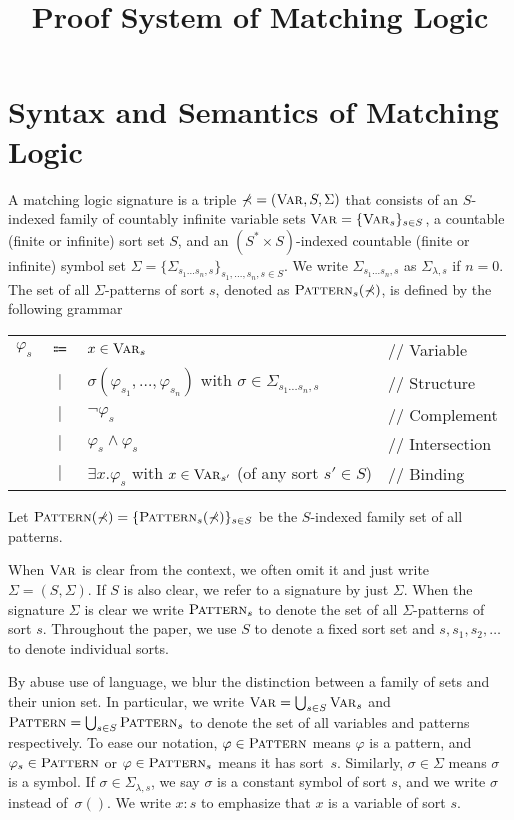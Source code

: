 \documentclass[acmsmall]{acmart}
\title{Proof System of Matching Logic}
\theoremstyle{acmdefinition}
\newcommand{\Var}{\textnormal{\textsc{Var}}}
\newcommand{\sig}{\mathbb{\Sigma}}
\newcommand{\Pattern}{\textnormal{\textsc{Pattern}}}
\newcommand{\ddd}{,\dots,}
\newcommand{\cln}{{:}}
\newcommand{\doubleslash}{//\xspace}
\newcommand{\SigmaSub}[1]{\Sigma_{#1}}
\begin{document}
\maketitle

\section{Syntax and Semantics of Matching Logic}

\begin{definition}
\label{def_syntax}
A matching logic signature is a triple
$\sig = (\Var, S, \Sigma)$
that consists of
an $S$-indexed family of countably infinite variable sets
$\Var = \{ \Var_s \}_{s \in S}$,
a countable (finite or infinite) sort set $S$,
and an $(S^* \times S)$-indexed countable (finite or infinite)
symbol set $\Sigma = \{ \SigmaSub{s_1 \dots s_n ,s} \}_{s_1 \ddd s_n , s \in S}$.
We write $\SigmaSub{s_1 \dots s_n , s}$ as
$\SigmaSub{\lambda , s}$ if $n = 0$.
The set of all $\sig$-patterns of sort $s$,
denoted as $\Pattern_s(\sig)$,
is defined by the following grammar
\begin{center}
\begin{tabular}{rcll}
$\varphi_s$
& $\Coloneqq$
& $x \in \Var_s$
& \doubleslash Variable
\\
& $|$
& $\sigma(\varphi_{s_1} \ddd \varphi_{s_n})$
  with $\sigma \in \SigmaSub{s_1 \dots s_n , s}$
& \doubleslash Structure
\\
& $|$
& $\neg \varphi_s$
& \doubleslash Complement
\\
& $|$
& $\varphi_s \wedge \varphi_s$
& \doubleslash Intersection
\\
& $|$
& $\exists x . \varphi_s$
  with $x \in \Var_{s'}$ (of any sort $s' \in S$)
& \doubleslash Binding
\end{tabular}
\end{center}
Let $\Pattern(\sig) = \{ \Pattern_s(\sig) \}_{s \in S}$
be the $S$-indexed family set of all patterns.
\end{definition}


When $\Var$ is clear from the context,
we often omit it and just write $\sig = (S, \Sigma)$.
If $S$ is also clear, we refer to a signature
by just $\Sigma$.
When the signature $\sig$ is clear
we write $\Pattern_s$ to denote 
the set of all $\sig$-patterns of sort $s$.
Throughout the paper, we use $S$ to denote a fixed sort set
and $s,s_1,s_2,\dots$ to denote individual sorts.

By abuse use of language,
we blur the distinction between
a family of sets and their union set.
In particular, 
we write $\Var = \bigcup_{s \in S} \Var_s$
and $\Pattern = \bigcup_{s \in S} \Pattern_s$
to denote the set of all variables and patterns respectively.
To ease our notation,
$\varphi \in \Pattern$ means $\varphi$ is a pattern,
and $\varphi_s \in \Pattern$ or $\varphi \in \Pattern_s$ means
it has sort~$s$.
Similarly, $\sigma \in \Sigma$ means $\sigma$ is a symbol.
If $\sigma \in \SigmaSub{\lambda, s}$, we say $\sigma$
is a constant symbol of sort $s$, and
we write $\sigma$ instead of~$\sigma()$.
We write $x \cln s$ to emphasize that $x$ is a variable of sort $s$.
\end{document}
